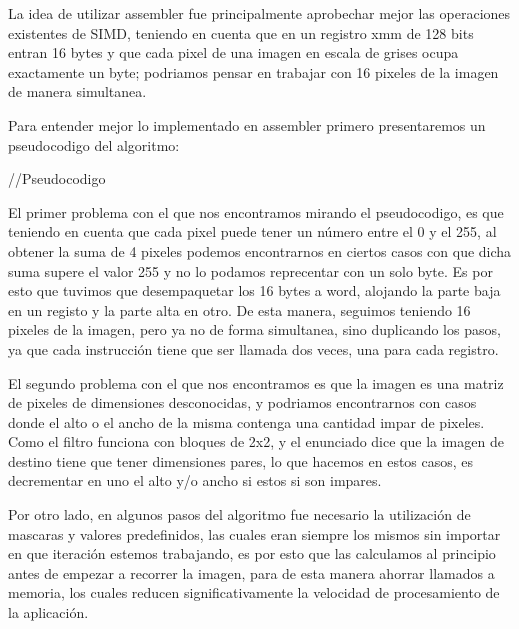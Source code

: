 La idea de utilizar assembler fue principalmente aprobechar mejor las operaciones existentes de SIMD, teniendo en cuenta que en un registro xmm de 128 bits entran 16 bytes y que cada pixel de una imagen en escala de grises ocupa exactamente un byte; podriamos pensar en trabajar con 16 pixeles de la imagen de manera simultanea. 

Para entender mejor lo implementado en assembler primero presentaremos un pseudocodigo del algoritmo:

//Pseudocodigo

El primer problema con el que nos encontramos mirando el pseudocodigo, es que teniendo en cuenta que cada pixel puede tener un número entre el 0 y el 255, al obtener la suma de 4 pixeles podemos encontrarnos en ciertos casos con que dicha suma supere el valor 255 y no lo podamos reprecentar con un solo byte. Es por esto que tuvimos que desempaquetar los 16 bytes a word, alojando la parte baja en un registo y la parte alta en otro. De esta manera, seguimos teniendo 16 pixeles de la imagen, pero ya no de forma simultanea, sino duplicando los pasos, ya que cada instrucción tiene que ser llamada dos veces, una para cada registro.

El segundo problema con el que nos encontramos es que la imagen es una matriz de pixeles de dimensiones desconocidas, y podriamos encontrarnos con casos donde el alto o el ancho de la misma contenga una cantidad impar de pixeles. Como el filtro funciona con bloques de 2x2, y el enunciado dice que la imagen de destino tiene que tener dimensiones pares, lo que hacemos en estos casos, es decrementar en uno el alto y/o ancho si estos si son impares.

Por otro lado, en algunos pasos del algoritmo fue necesario la utilización de mascaras y valores predefinidos, las cuales eran siempre los mismos sin importar en que iteración estemos trabajando, es por esto que las calculamos al principio antes de empezar a recorrer la imagen, para de esta manera ahorrar llamados a memoria, los cuales reducen significativamente la velocidad de procesamiento de la aplicación.

